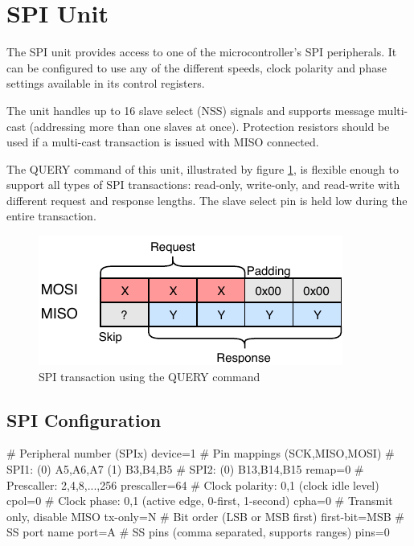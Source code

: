 \section{SPI Unit}

The \gls{SPI} unit provides access to one of the microcontroller's \gls{SPI} peripherals. It can be configured to use any of the different speeds, clock polarity and phase settings available in its control registers.

The unit handles up to 16 slave select (\gls{NSS}) signals and supports message multi-cast (addressing more than one slaves at once). Protection resistors should be used if a multi-cast transaction is issued with \gls{MISO} connected.

The QUERY command of this unit, illustrated by figure \ref{fig:spi_query}, is flexible enough to support all types of \gls{SPI} transactions: read-only, write-only, and read-write with different request and response lengths. The slave select pin is held low during the entire transaction.

\begin{figure}[h]
	\centering
	\includegraphics[scale=1.1] {img/spi-query.pdf}
	\caption{\label{fig:spi_query}SPI transaction using the QUERY command}
\end{figure}

\subsection{SPI Configuration}

\begin{inicode}
# Peripheral number (SPIx)
device=1
# Pin mappings (SCK,MISO,MOSI)
#  SPI1: (0) A5,A6,A7     (1) B3,B4,B5
#  SPI2: (0) B13,B14,B15
remap=0
# Prescaller: 2,4,8,...,256
prescaller=64
# Clock polarity: 0,1 (clock idle level)
cpol=0
# Clock phase: 0,1 (active edge, 0-first, 1-second)
cpha=0
# Transmit only, disable MISO
tx-only=N
# Bit order (LSB or MSB first)
first-bit=MSB
# SS port name
port=A
# SS pins (comma separated, supports ranges)
pins=0
\end{inicode}

